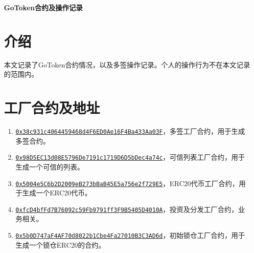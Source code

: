 \documentclass[12pt]{article}
\newcommand{\ethaddr}[1]{{\href{https://etherscan.io/address/#1}{\texttt{#1}}}}
\begin{document}
\pagestyle{empty}
\renewcommand{\contentsname}{目录}
\renewcommand{\abstractname}{摘要}
\renewcommand{\refname}{参考文献}
\renewcommand{\figurename}{图}
\renewcommand{\tablename}{表}
\renewcommand{\baselinestretch}{1.5}
\renewcommand{\appendixname}{附录}
\renewcommand{\proofname}{证明}

\pagecolor{\pcolor}

\begin{titlepage}
  \begin{center}
    \vspace*{5.5cm}

    \vspace{0.5cm}


   \textbf{\huge{GoToken合约及操作记录}}

    \vspace{0.5cm}
    
    \textbf{}
  \end{center}

\end{titlepage}
\setcounter{page}{0}
\tableofcontents
\newpage
\setcounter{page}{1}
\pagestyle{fancy}
\vspace*{0.01cm}

\section{介绍}
本文记录了GoToken合约情况，以及多签操作记录。个人的操作行为不在本文记录的范围内。

\section{工厂合约及地址}
\begin{enumerate}

\item \ethaddr{0x38c931c4064459468d4F6ED0Ae16F4Ba433Aa03F}，多签工厂合约，用于生成多签合约。
\item \ethaddr{0x98D5EC13d08E5796De7191c1719D6D5bDec4a74c}，可信列表工厂合约，用于生成一个可信的列表。
\item \ethaddr{0x5004e5C6b2D2009eB273bBaB45E5a756e2f729E5}，ERC20代币工厂合约，用于生成一个ERC20代币。
\item \ethaddr{0xfcD4bfFd7B76092c59Fb9791ff3F9B5405D4010A}，投资及分发工厂合约，业务相关。
\item \ethaddr{0x5b0D747aF4AF70d8022b1Cbe4Fa27010B3C3AD6d}，初始锁仓工厂合约，用于生成一个锁仓ERC20的合约。
\end{enumerate}
\end{document}
